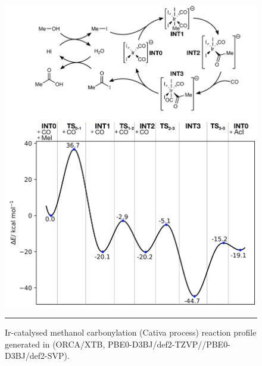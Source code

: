 \documentclass[../../main.tex]{subfiles}
\begin{document}
\begin{figure}[h!]
\vspace{0.4cm}
\centering
\includegraphics[width=14cm]{5/autode/figs/figS21}
\vspace{0.2cm}
\hrule
\caption{Ir-catalysed methanol carbonylation (Cativa process) reaction profile generated in \ade (ORCA/XTB, PBE0-D3BJ/def2-TZVP//PBE0-D3BJ/def2-SVP).}
\label{fig::ade_si_21}
\end{figure}
\end{document}
